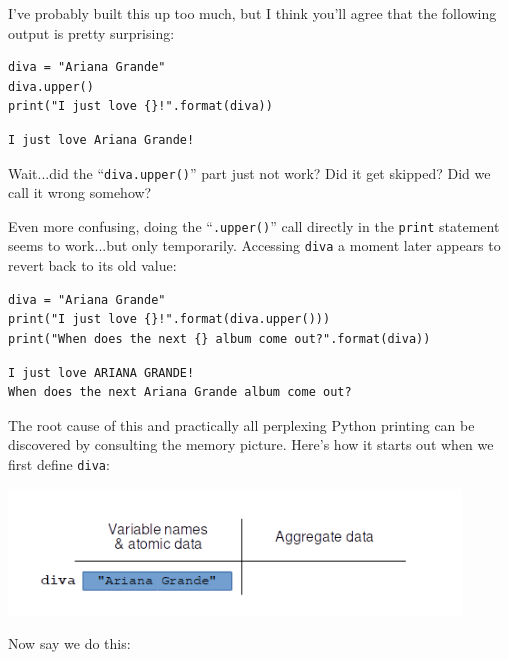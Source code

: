 I've probably built this up too much, but I think you'll agree that the
following output is pretty surprising:

\begin{Verbatim}[fontsize=\small,samepage=true,frame=single,framesep=3mm]
diva = "Ariana Grande"
diva.upper()
print("I just love {}!".format(diva))
\end{Verbatim}

\begin{Verbatim}[fontsize=\small,samepage=true,frame=leftline,framesep=5mm,framerule=1mm]
I just love Ariana Grande!
\end{Verbatim}

Wait...did the ``\texttt{diva.upper()}'' part just not work? Did it get
skipped? Did we call it wrong somehow?

Even more confusing, doing the ``\texttt{.upper()}'' call directly in the
\texttt{print} statement seems to work...but only temporarily. Accessing
\texttt{diva} a moment later appears to revert back to its old value:

\begin{Verbatim}[fontsize=\small,samepage=true,frame=single,framesep=3mm]
diva = "Ariana Grande"
print("I just love {}!".format(diva.upper()))
print("When does the next {} album come out?".format(diva))
\end{Verbatim}

\begin{Verbatim}[fontsize=\small,samepage=true,frame=leftline,framesep=5mm,framerule=1mm]
I just love ARIANA GRANDE!
When does the next Ariana Grande album come out?
\end{Verbatim}

The root cause of this and practically all perplexing Python printing can be
discovered by consulting the memory picture. Here's how it starts out when we
first define \texttt{diva}:

\vspace{-.2in}
\begin{center}
\includegraphics[width=0.9\textwidth]{bomb.png}
\end{center}

Now say we do this:

